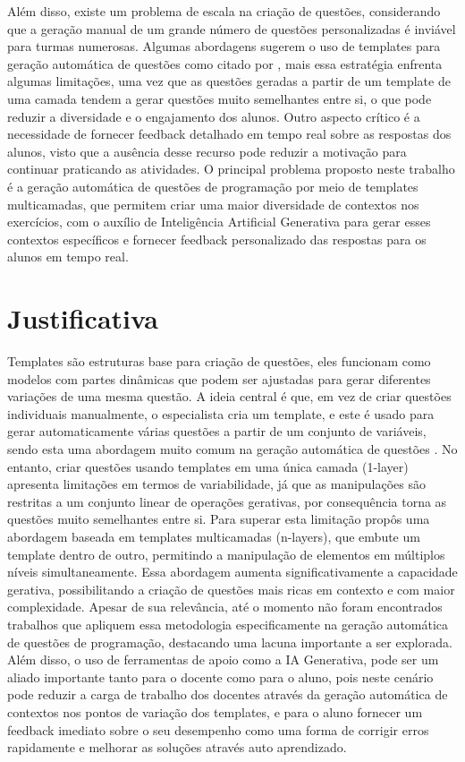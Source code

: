 Além disso, existe um problema de escala na criação de questões, considerando que a geração manual de um grande número de questões personalizadas é inviável para turmas numerosas. Algumas abordagens sugerem o uso de templates para geração automática de questões como citado por \parencite{zavala2018},  mais essa estratégia enfrenta algumas limitações, uma vez que as questões geradas a partir de um template de uma camada tendem a gerar questões muito semelhantes entre si, o que pode reduzir a diversidade e o engajamento dos alunos. Outro aspecto crítico é a necessidade de fornecer feedback detalhado em tempo real sobre as respostas dos alunos, visto que a ausência desse recurso pode reduzir a motivação para continuar praticando as atividades.  O principal problema proposto neste trabalho é a geração automática de questões de programação por meio de templates multicamadas, que permitem criar uma maior diversidade de contextos nos exercícios, com o auxílio de Inteligência Artificial Generativa para gerar esses contextos específicos e fornecer feedback personalizado das respostas para os alunos em tempo real.



\section{Justificativa}

Templates são estruturas base para criação de questões, eles funcionam como modelos com partes dinâmicas que podem ser ajustadas para gerar diferentes variações de uma mesma questão. A ideia central é que, em vez de criar questões individuais manualmente, o especialista cria um template, e este é usado para gerar automaticamente várias questões a partir de um conjunto de variáveis, sendo esta uma abordagem muito comum na geração automática de questões \parencite{zavala2018}.  No entanto, criar questões usando templates em uma única camada (1-layer) apresenta limitações em termos de variabilidade, já que as manipulações são restritas a um conjunto linear de operações gerativas, por consequência torna as questões muito semelhantes entre si. Para superar esta limitação \parencite{lai2013} propôs uma abordagem baseada em templates multicamadas (n-layers), que embute um template dentro de outro, permitindo a manipulação de elementos em múltiplos níveis simultaneamente. Essa abordagem aumenta significativamente a capacidade gerativa, possibilitando a criação de questões mais ricas em contexto e com maior complexidade. Apesar de sua relevância, até o momento não foram encontrados trabalhos que apliquem essa metodologia especificamente na geração automática de questões de programação, destacando uma lacuna importante a ser explorada. Além disso, o uso de ferramentas de apoio como a IA Generativa, pode ser um aliado importante tanto para o docente como para o aluno, pois neste cenário pode reduzir a carga de trabalho dos docentes através da geração automática de contextos nos pontos de variação dos templates, e para o aluno fornecer um feedback  imediato sobre o seu desempenho como uma forma de corrigir erros rapidamente e melhorar as soluções através auto aprendizado.


